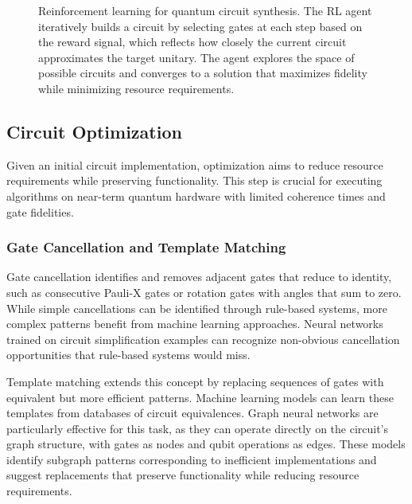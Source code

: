 \begin{figure}[!t]
\caption{Reinforcement learning for quantum circuit synthesis. The RL agent iteratively builds a circuit by selecting gates at each step based on the reward signal, which reflects how closely the current circuit approximates the target unitary. The agent explores the space of possible circuits and converges to a solution that maximizes fidelity while minimizing resource requirements.}
\label{fig:rl_circuit_synthesis}
\end{figure}

\subsection{Circuit Optimization}

Given an initial circuit implementation, optimization aims to reduce resource requirements while preserving functionality. This step is crucial for executing algorithms on near-term quantum hardware with limited coherence times and gate fidelities.

\subsubsection{Gate Cancellation and Template Matching}

Gate cancellation identifies and removes adjacent gates that reduce to identity, such as consecutive Pauli-X gates or rotation gates with angles that sum to zero. While simple cancellations can be identified through rule-based systems, more complex patterns benefit from machine learning approaches. Neural networks trained on circuit simplification examples can recognize non-obvious cancellation opportunities that rule-based systems would miss.

Template matching extends this concept by replacing sequences of gates with equivalent but more efficient patterns. Machine learning models can learn these templates from databases of circuit equivalences. Graph neural networks are particularly effective for this task, as they can operate directly on the circuit's graph structure, with gates as nodes and qubit operations as edges. These models identify subgraph patterns corresponding to inefficient implementations and suggest replacements that preserve functionality while reducing resource requirements.

